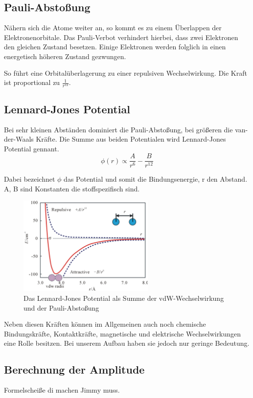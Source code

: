         \subsection{Pauli-Abstoßung}

Nähern sich die Atome weiter an, so kommt es zu einem Überlappen der 
Elektronenorbitale. Das Pauli-Verbot verhindert hierbei, dass zwei Elektronen den
gleichen Zustand besetzen. Einige Elektronen werden folglich in einen energetisch
höheren Zustand gezwungen. \par
So führt eine Orbitalüberlagerung zu einer repulsiven Wechselwirkung. Die Kraft
ist proportional zu $\displaystyle \frac{1}{r^{12}}$.

        \subsection{Lennard-Jones Potential}

Bei sehr kleinen Abständen dominiert die Pauli-Abstoßung, bei größeren die 
van-der-Waals Kräfte. Die Summe aus beiden Potentialen wird Lennard-Jones 
Potential gennant. 
\[
   \phi (r) \propto \frac{A}{r^6} - \frac{B}{r^{12}}    
\]

Dabei bezeichnet $\phi$ das Potential und somit die Bindungsenergie, r den Abstand.
A, B sind Konstanten die stoffspezifisch sind.

\begin{figure}[h!]
    \centering
    \includegraphics[width=0.6\textwidth]{Abb/ljp.jpg}
    \caption{Das Lennard-Jones Potential als Summe der vdW-Wechselwirkung und
             der Pauli-Abstoßung}
    \label{ljp}
\end{figure}



Neben diesen Kräften können im Allgemeinen auch noch chemische Bindungskräfte, Kontaktkräfte, magnetische und elektrische Wechselwirkungen eine Rolle besitzen.
Bei unserem Aufbau haben sie jedoch nur geringe Bedeutung.

 
\subsection{Berechnung der Amplitude}
 
Formelscheiße di machen Jimmy muss.


